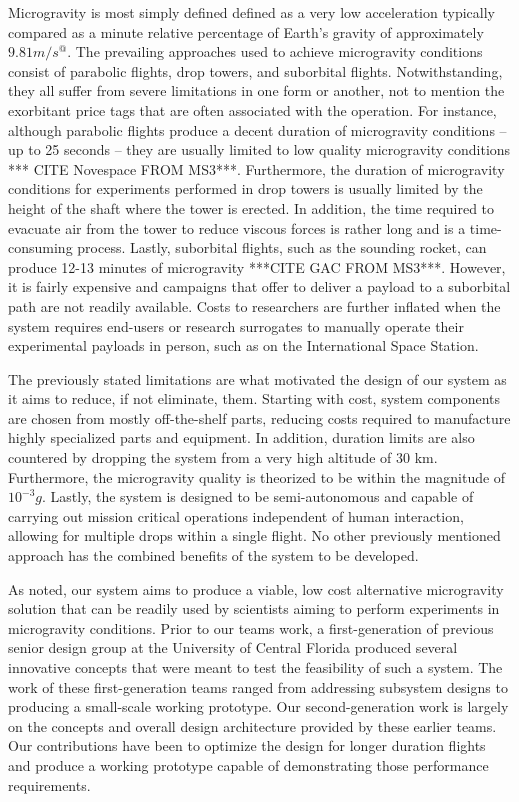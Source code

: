 \indent\indent Microgravity is most simply defined defined as a very low acceleration typically compared as a minute relative percentage of Earth's gravity of approximately $9.81 m/s^@$. The prevailing approaches used to achieve microgravity conditions consist of parabolic flights, drop towers, and suborbital flights. Notwithstanding, they all suffer from severe limitations in one form or another, not to mention the exorbitant price tags that are often associated with the operation. For instance, although parabolic flights produce a decent duration of microgravity conditions – up to 25 seconds – they are usually limited to low quality microgravity conditions *** CITE Novespace FROM MS3***. Furthermore, the duration of microgravity conditions for experiments performed in drop towers is usually limited by the height of the shaft where the tower is erected. In addition, the time required to evacuate air from the tower to reduce viscous forces is rather long and is a time-consuming process. Lastly, suborbital flights, such as the sounding rocket, can produce 12-13 minutes of microgravity ***CITE GAC FROM MS3***. However, it is fairly expensive and campaigns that offer to deliver a payload to a suborbital path are not readily available. Costs to researchers are further inflated when the system requires end-users or research surrogates to manually operate their experimental payloads in person, such as on the International Space Station.

The previously stated limitations are what motivated the design of our system as it aims to reduce, if not eliminate, them. Starting with cost, system components are chosen from mostly off-the-shelf parts, reducing costs required to manufacture highly specialized parts and equipment. In addition, duration limits are also countered by dropping the system from a very high altitude of 30 km. Furthermore, the microgravity quality is theorized to be within the magnitude of $10^{\minus 3}g$. Lastly, the system is designed to be semi-autonomous and capable of carrying out mission critical operations independent of human interaction, allowing for multiple drops within a single flight. No other previously mentioned approach has the combined benefits of the system to be developed.

As noted, our system aims to produce a viable, low cost alternative microgravity solution that can be readily used by scientists aiming to perform experiments in microgravity conditions. Prior to our teams work, a first-generation of previous senior design group at the University of Central Florida produced several innovative concepts that were meant to test the feasibility of such a system. The work of these first-generation teams ranged from addressing subsystem designs to producing a small-scale working prototype. Our second-generation work is largely on the concepts and overall design architecture provided by these earlier teams. Our contributions have been to optimize the design for longer duration flights and produce a working prototype capable of demonstrating those performance requirements. 

